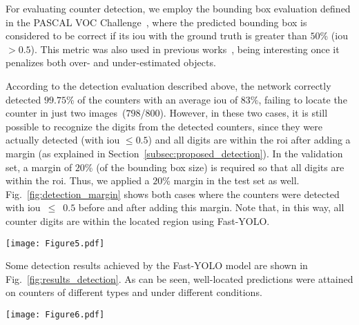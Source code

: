 For evaluating counter detection, we employ the bounding box evaluation defined in the PASCAL VOC Challenge~\cite{everingham2010pascalvoc}, where the predicted bounding box is considered to be correct if its \gls*{iou} with the ground truth is greater than $50$\% (\gls*{iou}~$>0.5$). 
This metric was also used in previous works~\cite{nodari2011multineural,vanetti2013gas}, being interesting once it penalizes both over- and under-estimated objects.

According to the detection evaluation described above, the network correctly detected $99.75$\% of the counters with an average \gls*{iou} of $83\%$, failing to locate the counter in just two images~($798$/$800$). However,  in these two cases, it is still possible to recognize the digits from the detected counters, since they were actually detected (with \gls*{iou} $\le 0.5$) and all digits are within the \gls*{roi} after adding a margin (as explained in Section~\ref{subsec:proposed_detection}). In the validation set, a margin of $20$\% (of the bounding box size) is required so that all digits are within the \gls*{roi}. Thus, we applied a $20$\% margin in the test set as well. Fig.~\ref{fig:detection_margin} shows both cases where the counters were detected with \gls*{iou}~$\le$~$0.5$ before and after adding this margin. Note that, in this way, all counter digits are within the located region using Fast-YOLO. 

\captionsetup[subfigure]{position=bottom}
\begin{figure*}[!htb]
	\begin{center}
	\texttt{[image: Figure5.pdf]}
	\end{center}
	\vspace{-3mm}
	\caption{Bounding boxes predicted by the Fast-YOLO model before~(a) and after~(b) adding the margin ($20$\%~of the bounding box~size).}
	\label{fig:detection_margin}    
\end{figure*}

Some detection results achieved by the Fast-YOLO model are shown in Fig.~\ref{fig:results_detection}. 
As can be seen, well-located predictions were attained on counters of different types and under different conditions.

\begin{figure*}[!htb]
	\begin{center}
	\texttt{[image: Figure6.pdf]}
	\end{center}
	\vspace{-2mm}
	\caption{Samples of counter detection obtained with the Fast-YOLO model in the \dataset dataset.
	}
	\label{fig:results_detection}    
\end{figure*}


